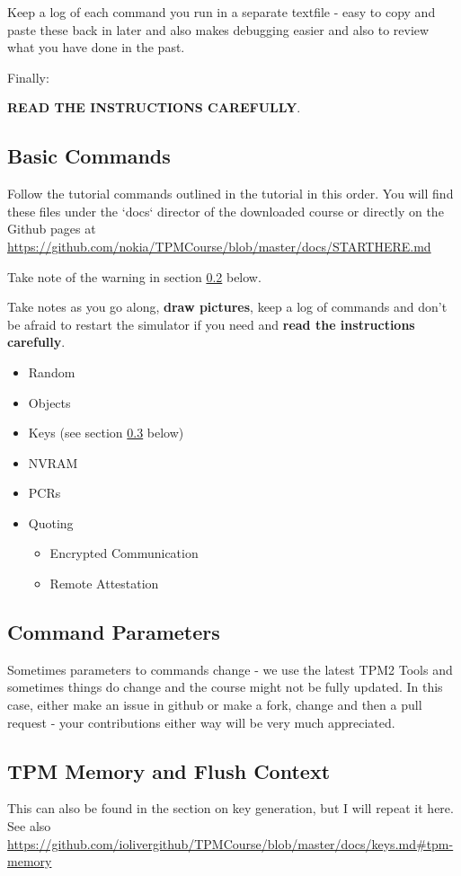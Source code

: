 \documentclass[11pt,a4paper]{article}
\begin{document}
Keep a log of each command you run in a separate textfile - easy to copy and paste these back in later and also makes debugging easier and also to review what you have done in the past. 

Finally:
\begin{center}
 \Large\textbf{READ THE INSTRUCTIONS CAREFULLY}.\normalsize
\end{center}


\subsection{Basic Commands}
Follow the tutorial commands outlined in the tutorial in this order. You will find these files under the `docs` director of the downloaded course or directly on the Github pages at \url{https://github.com/nokia/TPMCourse/blob/master/docs/STARTHERE.md}

Take note of the warning in section \ref{commandparameters} below.

Take notes as you go along, \textbf{draw pictures}, keep a log of commands and don't be afraid to restart the simulator if you need and \textbf{read the instructions carefully}.

\begin{itemize}
\item Random
\item Objects
\item Keys  (see section \ref{flush} below)
\item NVRAM
\item PCRs
\item Quoting
 \begin{itemize}
   \item Encrypted Communication
   \item Remote Attestation
 \end{itemize}
\end{itemize}

\subsection{Command Parameters}\label{commandparameters}
Sometimes parameters to commands change - we use the latest TPM2 Tools and sometimes things do change and the course might not be fully updated. In this case, either make an issue in github or make a fork, change and then a pull request - your contributions either way will be very much appreciated.


\subsection{TPM Memory and Flush Context}\label{flush}
This can also be found in the section on key generation, but I will repeat it here. See also \url{https://github.com/iolivergithub/TPMCourse/blob/master/docs/keys.md#tpm-memory}
\end{document}
